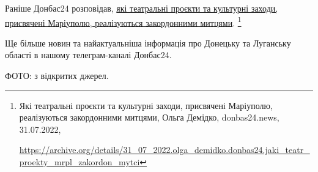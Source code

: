 
Раніше Донбас24 розповідав, \href{https://archive.org/details/31_07_2022.olga_demidko.donbas24.jaki_teatr_proekty_mrpl_zakordon_mytci}{які театральні проєкти та культурні заходи,
присвячені Маріуполю, реалізуються закордонними митцями}.%
\footnote{Які театральні проєкти та культурні заходи, присвячені Маріуполю, реалізуються закордонними митцями, %
Ольга Демідко, donbas24.news, 31.07.2022, \par%
\url{https://archive.org/details/31_07_2022.olga_demidko.donbas24.jaki_teatr_proekty_mrpl_zakordon_mytci}%
}

Ще більше новин та найактуальніша інформація про Донецьку та Луганську області
в нашому телеграм-каналі Донбас24.

ФОТО: з відкритих джерел.

